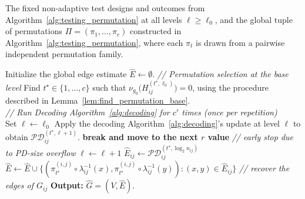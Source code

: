 \documentclass[journal]{IEEEtran}
\theoremstyle{definition}
\theoremstyle{definition}
\newcommand{\PV}{\nu}
\newcommand{\kb}{\overline{k}}
\begin{document}
\begin{algorithm*}[t]
\caption{Decoder Design Based on Permutations and Smaller Subproblems}
\label{alg:decoding_permutation}
\begin{algorithmic}[1]
\REQUIRE The fixed non-adaptive test designs and outcomes from Algorithm~\ref{alg:testing_permutation} at all levels $\ell \ge \ell_{0}$,
and the global tuple of permutations \(\Pi=(\pi_1,\dots,\pi_c)\) constructed in Algorithm~\ref{alg:testing_permutation}, where each \(\pi_t\) is drawn
from a pairwise independent permutation family.


\STATE Initialize the global edge estimate $\widehat{E} \gets \emptyset$.
  \STATE \textit{\color{blue}// Permutation selection at the base level}
  \STATE Find $t^\star \in \{1,\dots,c\}$ such that $\PV_{g_0} \big(H_{ij}^{(t^\star,\ell_{0})}\big) = 0$, using the procedure described in Lemma~\ref{lem:find_permutation_base}.  \\
  
\textit{\color{blue}// Run Decoding Algorithm~\ref{alg:decoding} for $c'$ times (once per repetition)} \\
    \STATE Set $\ell \gets \ell_0$
      \STATE Apply the decoding Algorithm~\ref{alg:decoding}'s update at level $\ell$ to obtain $\mathcal{PD}_{ij}^{(t^{\star},\ell+1)}$.
      \IF{$\bigl|\mathcal{PD}_{ij}^{(t^{\star},\ell+1)}\bigr| > 7\kb^{4\gamma}$}
        \STATE \textbf{break and move to the next $r$ value} \hfill \textit{\color{blue}// early stop due to PD-size overflow}
      \ELSE
        \STATE $\ell \gets \ell + 1$
      \ENDIF
    \ENDWHILE
    \STATE $\widehat{E}_{ij} \gets \mathcal{PD}_{ij}^{(t^{\star},\log_2 n_{ij})}$
    \STATE $\widehat{E} \gets  \widehat{E} \cup \{(\pi_{t^\star}^{(i,j)} \circ \lambda_{ij}^{-1}(x),\pi_{t^\star}^{(i,j)} \circ \lambda_{ij}^{-1}(y)): (x,y) \in  \widehat{E}_{ij}\}$ \hfill \textit{\color{blue}// recover the edges of $G_{ij}$}
  \ENDFOR
\ENDFOR
\STATE \textbf{Output:} $\widehat{G} = (V,\widehat{E})$.

\end{algorithmic}
\end{algorithm*}
\end{document}
